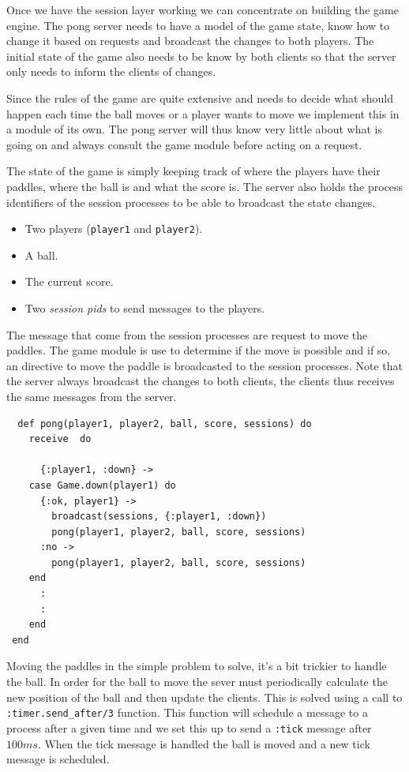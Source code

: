 \documentclass[a4paper,11pt]{article}
\begin{document}
Once we have the session layer working we can concentrate on building
the game engine. The pong server needs to have a model of the game
state, know how to change it based on requests and broadcast the
changes to both players. The initial state of the game also needs to be
know by both clients so that the server only needs to inform the
clients of changes.

Since the rules of the game are quite extensive and needs to decide
what should happen each time the ball moves or a player wants to move
we implement this in a module of its own. The pong server will thus
know very little about what is going on and always consult the game
module before acting on a request. 

The state of the game is simply keeping track of where the players
have their paddles, where the ball is and what the score is. The
server also holds the process identifiers of the session processes to
be able to broadcast the state changes.


\begin{itemize}
\item Two players ({\tt player1} and {\tt player2}).
\item A ball.
\item The current score.
\item Two {\em session pids} to send messages to the players. 
\end{itemize}

The message that come from the session processes are request to move
the paddles. The game module is use to determine if the move is
possible and if so, an directive to move the paddle is broadcasted to
the session processes. Note that the server always broadcast the
changes to both clients, the clients thus receives the same messages
from the server.

\begin{verbatim}
  def pong(player1, player2, ball, score, sessions) do
    receive  do

      {:player1, :down} ->
	case Game.down(player1) do
	  {:ok, player1} ->
	    broadcast(sessions, {:player1, :down})
	    pong(player1, player2, ball, score, sessions)
	  :no ->
	    pong(player1, player2, ball, score, sessions)
	end
      :
      :
    end
 end
\end{verbatim}


Moving the paddles in the simple problem to solve, it's a bit trickier
to handle the ball. In order for the ball to move the sever must
periodically calculate the new position of the ball and then update
the clients. This is solved using a call to {\tt :timer.send_after/3}
function. This function will schedule a message to a process after a
given time and we set this up to send a {\tt :tick} message after
$100 ms$. When the tick message is handled the ball is moved and a new
tick message is scheduled.
\end{document}
